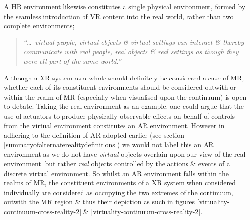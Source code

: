 A HR environment likewise constitutes a single physical environment, formed by the seamless introduction of VR content into the real world, rather than two complete environments;


\begin{quote}
	\textit{``\ldots\ virtual people, virtual objects \& virtual settings can interact \& thereby communicate with real people, real objects \& real settings as though they were all part of the same world.''}~\cite{Terashima2001}
\end{quote}

Although a XR system as a whole should definitely be considered a case of MR, whether each of its constituent environments should be considered outwith or within the realm of MR (especially when visualised upon the continuum) is open to debate. Taking the real environment as an example, one could argue that the use of actuators to produce physically observable effects on behalf of controls from the virtual environment constitutes an AR environment. However in adhering to the definition of AR adopted earlier (see section \ref{summaryofalternaterealitydefinitions}) we would not label this an AR environment as we do not have \textit{virtual} objects overlain upon our view of the real environment, but rather \textit{real} objects controlled by the actions \& events of a discrete virtual environment. So whilst an AR environment falls within the realms of MR, the constituent environments of a XR system when considered individually are considered as occupying the two extremes of the continuum, outwith the MR region \& thus their depiction as such in figures \ref{virtuality-continuum-cross-reality-2} \& \ref{virtuality-continuum-cross-reality-2}.



